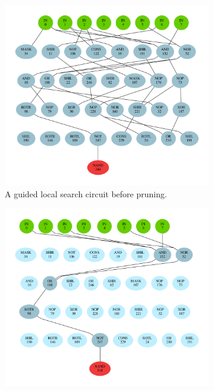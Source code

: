 \documentclass[
  print, %
  Table,   %
  nolof,     %
  nolot,     %
  11pt, %
  oneside  %
]{fithesis3}
\begin{document}
\begin{figure}
\begin{changemargin}{-3cm}{-3cm}
\begin{subfigure}{.65\textwidth}
  \centering
  \includegraphics[width=\textwidth]{./graphics/gls/circuit}
  \caption{A guided local search circuit before pruning.}
  \label{fig:gls-circuit-unpruned}
\end{subfigure}%
\begin{subfigure}{.65\textwidth}
  \centering
  \includegraphics[width=\textwidth]{./graphics/gls/pruned}

\end{subfigure}
\end{changemargin}
\end{figure}
\end{document}
